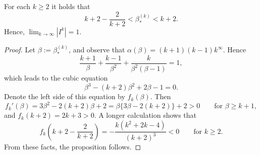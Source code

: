 \documentclass[10pt,a4paper]{amsart}
\newcommand{\al}{\alpha}
\newcommand{\f}{\infty}
\begin{document}
\begin{proposition} \label{prop:dominant-intervals}
For each $k\geq 2$ it holds that
\[
k+2-\frac{2}{k+2}<\beta_*^{(k)}<k+2.
\]
Hence, $\lim_{k\to\f}|I^k|=1$.
\end{proposition}

\begin{proof}
Let $\beta:=\beta_*^{(k)}$, and observe that $\al(\beta)=(k+1)(k-1)k^\f$. Hence
\[
\frac{k+1}{\beta}+\frac{k-1}{\beta^2}+\frac{k}{\beta^2(\beta-1)}=1,
\]
which leads to the cubic equation
\[
\beta^3-(k+2)\beta^2+2\beta-1=0.
\]
Denote the left side of this equation by $f_k(\beta)$. Then
\[
f_k'(\beta)=3\beta^2-2(k+2)\beta+2=\beta\{3\beta-2(k+2)\}+2>0 \qquad\mbox{for $\beta\geq k+1$},
\]
and $f_k(k+2)=2k+3>0$. A longer calculation shows that
\[
f_k\left(k+2-\frac{2}{k+2}\right)=-\frac{k(k^2+2k-4)}{(k+2)^3}<0 \qquad \mbox{for $k\geq 2$}.
\]
From these facts, the proposition follows.
\end{proof}
\end{document}
